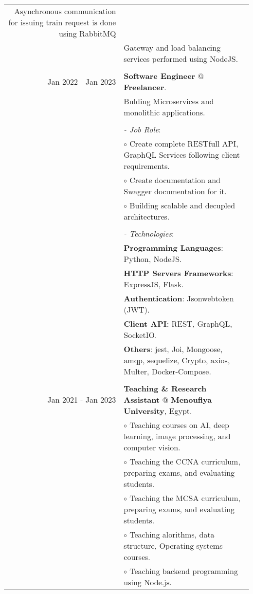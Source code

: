 \documentclass[a4paper,10pt]{article}
\begin{document}
\begin{longtable}{r|l}
    Asynchronous communication for issuing train request is done using RabbitMQ \\&
    Gateway and load balancing services performed using NodeJS. \\&
    \\
    Jan 2022 - Jan 2023 & \textbf{Software Engineer} @ 
    \textbf{Freelancer}. \\&
    Bulding Microservices and monolithic applications.\\&
    \\&
    \textit{- Job Role}:\\&
    $\circ$ Create complete RESTfull API, GraphQL Services following client requirements. \\&
    $\circ$ Create documentation and Swagger documentation for it. \\&
    $\circ$ Building scalable and decupled architectures. \\&
    \\&
    \textit{- Technologies}:\\&
    \textbf{Programming Languages}: Python, NodeJS.\\&
    \textbf{HTTP Servers Frameworks}: ExpressJS, Flask.\\&
    \textbf{Authentication}: Jsonwebtoken (JWT).\\&
    \textbf{Client API}: REST, GraphQL, SocketIO.\\&
    \textbf{Others}: jest, Joi, Mongoose, amqp, sequelize, Crypto, axios, Multer, Docker-Compose.\\&  
    \\
    Jan 2021 - Jan 2023 & \textbf{Teaching \& Research Assistant} @ 
    \textbf{Menoufiya University}, Egypt. \\&
    $\circ$ Teaching courses on AI, deep learning, image processing, and computer vision. \\&
    $\circ$ Teaching the CCNA curriculum, preparing exams, and evaluating students. \\&
    $\circ$ Teaching the MCSA curriculum, preparing exams, and evaluating students. \\&
    $\circ$ Teaching alorithms, data structure, Operating systems courses. \\&
    $\circ$ Teaching backend programming using Node.js. 
\end{longtable}
\end{document}
